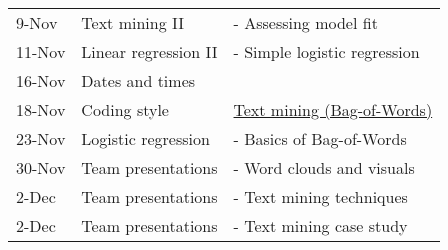 \documentclass[11pt]{article}
\begin{document}
\begin{center}
\begin{tabular}{lll}
9-Nov & Text mining II & - Assessing model fit\\
11-Nov & Linear regression II & - Simple logistic regression\\
16-Nov & Dates and times & \\
18-Nov & Coding style & \href{https://learn.datacamp.com/courses/text-mining-with-bag-of-words-in-r}{Text mining (Bag-of-Words)}\\
23-Nov & Logistic regression & - Basics of Bag-of-Words\\
30-Nov & Team presentations & - Word clouds and visuals\\
2-Dec & Team presentations & - Text mining techniques\\
2-Dec & Team presentations & - Text mining case study\\
\end{tabular}
\end{center}
\end{document}
